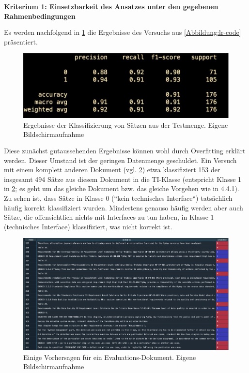 {\bf Kriterium 1: Einsetzbarkeit des Ansatzes unter den gegebenen Rahmenbedingungen}

Es werden nachfolgend in \ref{Abbildung:lr-test} die Ergebnisse des Versuchs aus \ref{Abbildung:lr-code} präsentiert.

\begin{figure}[h]
\centering
\includegraphics[scale=0.95]{content/pics/Picture_27.png}
\caption{Ergebnisse der Klassifizierung von Sätzen aus der Testmenge. Eigene Bildschirmaufnahme}
\label{Abbildung:lr-test}
\end{figure}

Diese zunächst gutaussehenden Ergebnisse können wohl durch Overfitting erklärt werden. Dieser Umstand ist der geringen Datenmenge geschuldet. Ein Versuch mit einem komplett anderen Dokument (vgl. \ref{Abbildung:lr-eval}) etwa klassifiziert 153 der insgesamt 494 Sätze aus diesem Dokument in die TI-Klasse (entspricht Klasse 1 in \ref{Abbildung:lr-eval}; es geht um das gleiche Dokument bzw. das gleiche Vorgehen wie in 4.4.1). Zu sehen ist, dass Sätze in Klasse 0 (``kein technisches Interface``) tatsächlich häufig korrekt klassifiziert wurden. Mindestens genauso häufig werden aber auch Sätze, die offensichtlich nichts mit Interfaces zu tun haben, in Klasse 1 (technisches Interface) klassifiziert, was nicht korrekt ist.

\begin{figure}[h]
\centering
\includegraphics[scale=0.95]{content/pics/Picture_28.png}
\caption{Einige Vorhersagen für ein Evaluations-Dokument. Eigene Bildschirmaufnahme}
\label{Abbildung:lr-eval}
\end{figure}

